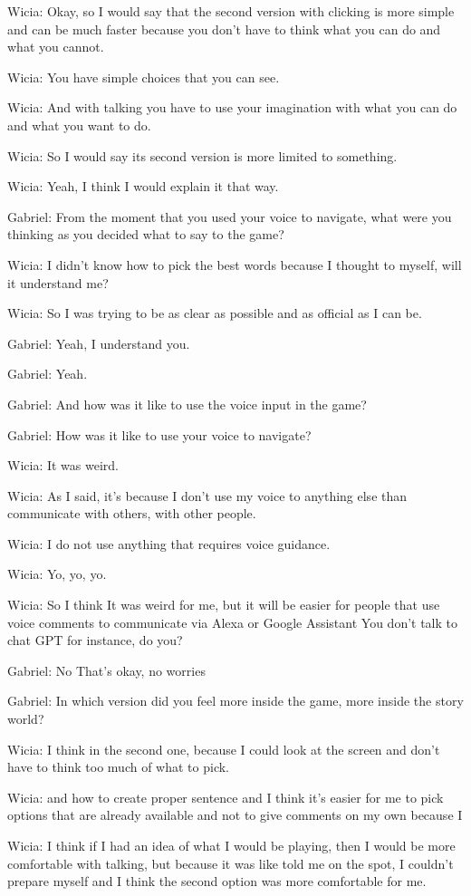 Wicia: Okay, so I would say that the second version with clicking is more simple and can be much faster because you don't have to think what you can do and what you cannot.

Wicia: You have simple choices that you can see.

Wicia: And with talking you have to use your imagination with what you can do and what you want to do.

Wicia: So I would say its second version is more limited to something.

Wicia: Yeah, I think I would explain it that way.

Gabriel: From the moment that you used your voice to navigate, what were you thinking as you decided what to say to the game?

Wicia: I didn't know how to pick the best words because I thought to myself, will it understand me?

Wicia: So I was trying to be as clear as possible and as official as I can be.

Gabriel: Yeah, I understand you.

Gabriel: Yeah.

Gabriel: And how was it like to use the voice input in the game?

Gabriel: How was it like to use your voice to navigate?

Wicia: It was weird.

Wicia: As I said, it's because I don't use my voice to anything else than communicate with others, with other people.

Wicia: I do not use anything that requires voice guidance.

Wicia: Yo, yo, yo.

Wicia: So I think It was weird for me, but it will be easier for people that use voice comments to communicate via Alexa or Google Assistant You don't talk to chat GPT for instance, do you?

Gabriel: No That's okay, no worries

Gabriel: In which version did you feel more inside the game, more inside the story world?

Wicia: I think in the second one, because I could look at the screen and don't have to think too much of what to pick.

Wicia: and how to create proper sentence and I think it's easier for me to pick options that are already available and not to give comments on my own because I

Wicia: I think if I had an idea of what I would be playing, then I would be more comfortable with talking, but because it was like told me on the spot, I couldn't prepare myself and I think the second option was more comfortable for me.

